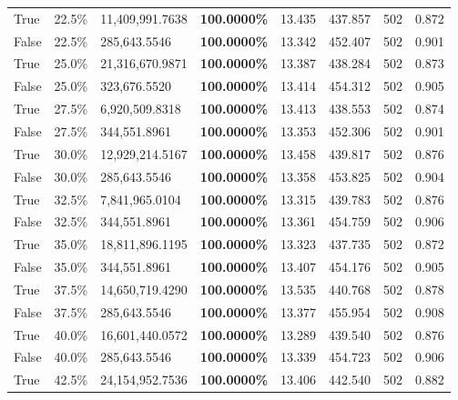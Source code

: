 \begin{table}[H]
{\begin{tabular}{lllrllll}
True & 22.5\% & 11,409,991.7638 & \bfseries \color{red} 100.0000\% & 13.435 & 437.857 & 502 & 0.872 \\
\cline{1-8}
False & 22.5\% & 285,643.5546 & \bfseries \color{red} 100.0000\% & 13.342 & 452.407 & 502 & 0.901 \\
\cline{1-8}
True & 25.0\% & 21,316,670.9871 & \bfseries \color{red} 100.0000\% & 13.387 & 438.284 & 502 & 0.873 \\
\cline{1-8}
False & 25.0\% & 323,676.5520 & \bfseries \color{red} 100.0000\% & 13.414 & 454.312 & 502 & 0.905 \\
\cline{1-8}
True & 27.5\% & 6,920,509.8318 & \bfseries \color{red} 100.0000\% & 13.413 & 438.553 & 502 & 0.874 \\
\cline{1-8}
False & 27.5\% & 344,551.8961 & \bfseries \color{red} 100.0000\% & 13.353 & 452.306 & 502 & 0.901 \\
\cline{1-8}
True & 30.0\% & 12,929,214.5167 & \bfseries \color{red} 100.0000\% & 13.458 & 439.817 & 502 & 0.876 \\
\cline{1-8}
False & 30.0\% & 285,643.5546 & \bfseries \color{red} 100.0000\% & 13.358 & 453.825 & 502 & 0.904 \\
\cline{1-8}
True & 32.5\% & 7,841,965.0104 & \bfseries \color{red} 100.0000\% & 13.315 & 439.783 & 502 & 0.876 \\
\cline{1-8}
False & 32.5\% & 344,551.8961 & \bfseries \color{red} 100.0000\% & 13.361 & 454.759 & 502 & 0.906 \\
\cline{1-8}
True & 35.0\% & 18,811,896.1195 & \bfseries \color{red} 100.0000\% & 13.323 & 437.735 & 502 & 0.872 \\
\cline{1-8}
False & 35.0\% & 344,551.8961 & \bfseries \color{red} 100.0000\% & 13.407 & 454.176 & 502 & 0.905 \\
\cline{1-8}
True & 37.5\% & 14,650,719.4290 & \bfseries \color{red} 100.0000\% & 13.535 & 440.768 & 502 & 0.878 \\
\cline{1-8}
False & 37.5\% & 285,643.5546 & \bfseries \color{red} 100.0000\% & 13.377 & 455.954 & 502 & 0.908 \\
\cline{1-8}
True & 40.0\% & 16,601,440.0572 & \bfseries \color{red} 100.0000\% & 13.289 & 439.540 & 502 & 0.876 \\
\cline{1-8}
False & 40.0\% & 285,643.5546 & \bfseries \color{red} 100.0000\% & 13.339 & 454.723 & 502 & 0.906 \\
\cline{1-8}
True & 42.5\% & 24,154,952.7536 & \bfseries \color{red} 100.0000\% & 13.406 & 442.540 & 502 & 0.882 \\

\end{tabular}}
\end{table}
